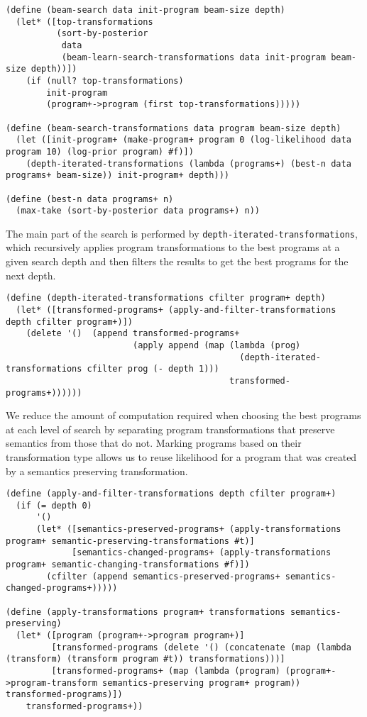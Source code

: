 \documentclass[a4paper,10pt]{article}
\begin{document}
\begin{lstlisting}[frame=trbl]
(define (beam-search data init-program beam-size depth)
  (let* ([top-transformations 
          (sort-by-posterior
           data 
           (beam-learn-search-transformations data init-program beam-size depth))])
    (if (null? top-transformations)
        init-program
        (program+->program (first top-transformations)))))

(define (beam-search-transformations data program beam-size depth)
  (let ([init-program+ (make-program+ program 0 (log-likelihood data program 10) (log-prior program) #f)])
    (depth-iterated-transformations (lambda (programs+) (best-n data programs+ beam-size)) init-program+ depth)))

(define (best-n data programs+ n)
  (max-take (sort-by-posterior data programs+) n))
\end{lstlisting}
The main part of the search is performed by \texttt{depth-iterated-transformations}, which recursively applies program transformations to the best programs at a given search depth and then filters the results to get the best programs for the next depth.
\begin{lstlisting}[frame=trbl]
(define (depth-iterated-transformations cfilter program+ depth)
  (let* ([transformed-programs+ (apply-and-filter-transformations depth cfilter program+)])
    (delete '()  (append transformed-programs+
                         (apply append (map (lambda (prog) 
                                              (depth-iterated-transformations cfilter prog (- depth 1))) 
                                            transformed-programs+))))))
\end{lstlisting}
We reduce the amount of computation required when choosing the best programs at each level of search by separating program transformations that preserve semantics from those that do not.  Marking programs based on their transformation type allows us to reuse likelihood for a program that was created by a semantics preserving transformation.
\begin{lstlisting}[frame=trbl]
(define (apply-and-filter-transformations depth cfilter program+)
  (if (= depth 0)
      '()
      (let* ([semantics-preserved-programs+ (apply-transformations program+ semantic-preserving-transformations #t)]
             [semantics-changed-programs+ (apply-transformations program+ semantic-changing-transformations #f)])
        (cfilter (append semantics-preserved-programs+ semantics-changed-programs+)))))

(define (apply-transformations program+ transformations semantics-preserving)
  (let* ([program (program+->program program+)]
         [transformed-programs (delete '() (concatenate (map (lambda (transform) (transform program #t)) transformations)))]
         [transformed-programs+ (map (lambda (program) (program+->program-transform semantics-preserving program+ program)) transformed-programs)])
    transformed-programs+))
\end{lstlisting}
\end{document}
